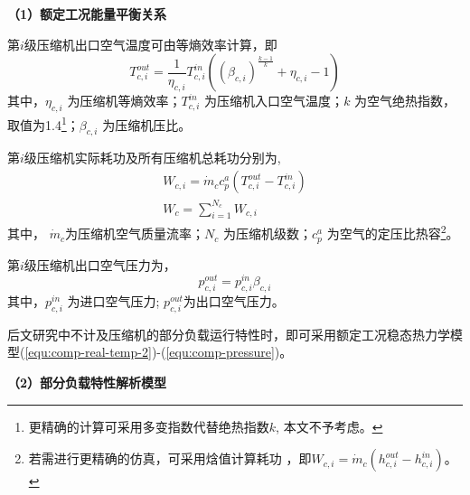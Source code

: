 \textbf{（1）额定工况能量平衡关系}


第$i$级压缩机出口空气温度可由等熵效率计算\cite{Eng-Thermo-83}，即
 \begin{equation}
\label{equ:comp-real-temp-2}
T_{c,i}^{out} = \frac{1}{{{\eta _{c,i}}}}T_{c,i}^{in}({{{({{\beta _{c,i}}})}^{\frac{{k - 1}}{k}}} + {\eta _{c,i}} - 1})
\end{equation}
其中，$\eta _{c,i}$ 为压缩机等熵效率；$T_{c,i}^{in}$ 为压缩机入口空气温度；$k$ 为空气绝热指数，取值为1.4\footnote{更精确的计算可采用多变指数代替绝热指数$k$, 本文不予考虑。}；${\beta _{c,i}}$ 为压缩机压比。

第$i$级压缩机实际耗功及所有压缩机总耗功分别为,
\begin{subequations}
\begin{gather}
{W_{c,i}} = {\dot m_c}c_p^a({T_{c,i}^{out} - T_{c,i}^{in}})\label{equ:comp-power}\\
{W_c} = \sum\limits_{i = 1}^{{N_c}} {} {W_{c,i}} \label{equ:comp-power-total}
\end{gather}
\end{subequations}
其中， $\dot m_c$为压缩机空气质量流率；$N_c$ 为压缩机级数；$c_p^a$ 为空气的定压比热容\footnote{若需进行更精确的仿真，可采用焓值计算耗功
\cite{Eng-Thermo-83}，即${W_{c,i}} = {\dot m_c}({h_{c,i}^{out} - h_{c,i}^{in}})$。}。

第$i$级压缩机出口空气压力为，
\begin{equation}
\label{equ:comp-pressure}
p_{c,i}^{out} = p_{c,i}^{in}{\beta _{c,i}}
\end{equation}
其中，$p_{c,i}^{in}$ 为进口空气压力; $p_{c,i}^{out}$为出口空气压力。

后文研究中不计及压缩机的部分负载运行特性时，即可采用额定工况稳态热力学模型(\ref{equ:comp-real-temp-2})-(\ref{equ:comp-pressure})。

\textbf{（2）部分负载特性解析模型}

